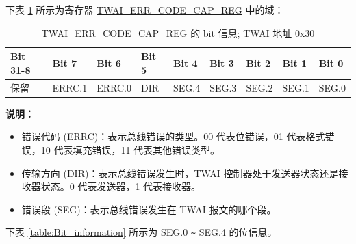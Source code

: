 \documentclass[main\_\_CN.tex]{subfiles}
\begin{document}
下表 \ref{table:ECC_REG1} 所示为寄存器 \hyperref[regdesc:TWAIERRCODECAPREG]{TWAI\_ERR\_CODE\_CAP\_REG} 中的域：

\begin{longtable}[c]{|p{1.4cm}|p{1.4cm}|p{1.4cm}|p{1.4cm}|p{1.4cm}|p{1.4cm}|p{1.4cm}|p{1.4cm}|p{1.4cm}|}
    \caption{\hyperref[regdesc:TWAIERRCODECAPREG]{TWAI\_ERR\_CODE\_CAP\_REG} 的 bit 信息; TWAI 地址 0x30}
    \label{table:ECC_REG1}\\
    \hline
    \rowcolor{lightgray}
    Bit 31-8 & Bit 7 & Bit 6 & Bit 5 & Bit 4 & Bit 3 & Bit 2 & Bit 1 & Bit 0\\\hline
    保留 & ERRC.1 & ERRC.0 & DIR & SEG.4 & SEG.3 & SEG.2 & SEG.1 & SEG.0\\
    \hline
\end{longtable}
\vspace{-1.5em}
{\bfseries 说明：}\\
\begin{itemize}
    \item 错误代码 (ERRC)：表示总线错误的类型。00 代表位错误，01 代表格式错误，10 代表填充错误，11 代表其他错误类型。
    \item 传输方向 (DIR)：表示总线错误发生时，TWAI 控制器处于发送器状态还是接收器状态。0 代表发送器，1 代表接收器。
    \item 错误段 (SEG)：表示总线错误发生在 TWAI 报文的哪个段。
\end{itemize}

下表 \ref{table:Bit_information} 所示为 SEG.0 \verb+~+ SEG.4 的位信息。
\end{document}
